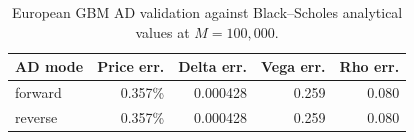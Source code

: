 \begin{table}[htbp]
\centering
\small
\caption{European GBM AD validation against Black--Scholes analytical values at $M=100{,}000$.}
\label{tab:correctness-validation}
\begin{tabular}{lrrrr}
\toprule
\textbf{AD mode} & \textbf{Price err.} & \textbf{Delta err.} & \textbf{Vega err.} & \textbf{Rho err.} \\
\midrule
forward & 0.357\% & 0.000428 & 0.259 & 0.080 \\
reverse & 0.357\% & 0.000428 & 0.259 & 0.080 \\
\bottomrule
\end{tabular}
\end{table}
